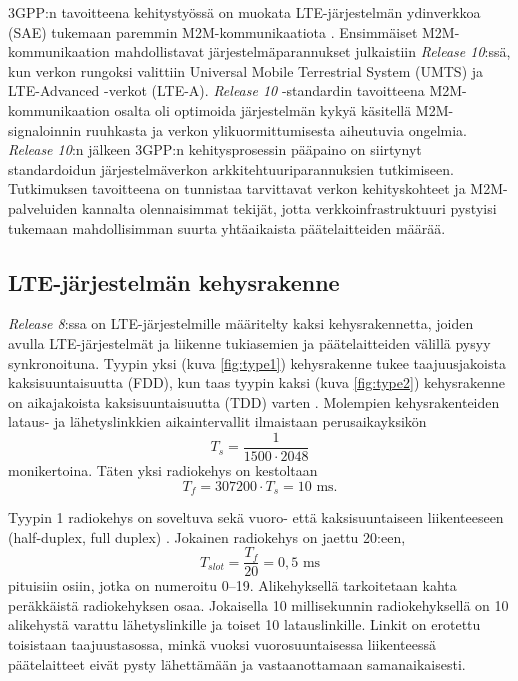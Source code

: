\documentclass[finnish, 12pt, a4paper, elec, latin1, utf8, online]{aaltothesis}
\begin{document}
3GPP:n tavoitteena kehitystyössä on muokata LTE-järjestelmän ydinverkkoa (SAE) tukemaan paremmin M2M-kommunikaatiota \cite{ghavimi2015m2m}. Ensimmäiset M2M-kommunikaation mahdollistavat järjestelmäparannukset julkaistiin \textit{Release 10}:ssä, kun verkon rungoksi valittiin Universal Mobile Terrestrial System (UMTS) ja LTE-Advanced -verkot (LTE-A). \textit{Release 10} -standardin tavoitteena M2M-kommunikaation osalta oli optimoida järjestelmän kykyä käsitellä M2M-signaloinnin ruuhkasta ja verkon ylikuormittumisesta aiheutuvia ongelmia. \textit{Release 10}:n jälkeen 3GPP:n kehitysprosessin pääpaino on siirtynyt standardoidun järjestelmäverkon arkkitehtuuriparannuksien tutkimiseen. Tutkimuksen tavoitteena on tunnistaa tarvittavat verkon kehityskohteet ja M2M-palveluiden kannalta olennaisimmat tekijät, jotta verkkoinfrastruktuuri pystyisi tukemaan mahdollisimman suurta yhtäaikaista päätelaitteiden määrää.

\subsection{LTE-järjestelmän kehysrakenne}

\textit{Release 8}:ssa on LTE-järjestelmille määritelty kaksi kehysrakennetta, joiden avulla LTE-järjestelmät ja liikenne tukiasemien ja päätelaitteiden välillä pysyy synkronoituna. Tyypin yksi (kuva \ref{fig:type1}) kehysrakenne tukee taajuusjakoista kaksisuuntaisuutta (FDD), kun taas tyypin kaksi (kuva \ref{fig:type2}) kehysrakenne on aikajakoista kaksisuuntaisuutta (TDD) varten \cite{ETSIts36211}. Molempien kehysrakenteiden lataus- ja lähetyslinkkien aikaintervallit ilmaistaan perusaikayksikön \begin{equation}
    T_s = \frac{1}{1500 \cdot 2048}
\end{equation}
monikertoina. Täten yksi radiokehys on kestoltaan
\begin{equation}
    T_f = 307200 \cdot T_s = 10 \textrm{ ms.}
\end{equation}

Tyypin 1 radiokehys on soveltuva sekä vuoro- että kaksisuuntaiseen liikenteeseen (half-duplex, full duplex) \cite{ETSIts36211}. Jokainen radiokehys on jaettu 20:een, \begin{equation}
    T_{slot} = \frac{T_f}{20} = 0,5 \textrm{ ms}
\end{equation}
pituisiin osiin, jotka on numeroitu 0--19. Alikehyksellä tarkoitetaan kahta peräkkäistä radiokehyksen osaa. Jokaisella 10 millisekunnin radiokehyksellä on 10 alikehystä varattu lähetyslinkille ja toiset 10 latauslinkille. Linkit on erotettu toisistaan taajuustasossa, minkä vuoksi vuorosuuntaisessa liikenteessä päätelaitteet eivät pysty lähettämään ja vastaanottamaan samanaikaisesti.
\end{document}
